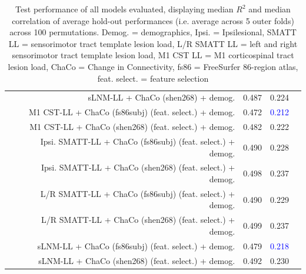 \documentclass[10pt]{article}
\newcommand{\colorProcessBlue}[1]{\textcolor{ProcessBlue}{#1}}
\newcommand{\colorNavyBlue}[1]{\textcolor{NavyBlue}{#1}}
\newcommand{\colorBlue}[1]{\textcolor{Blue}{#1}}
\begin{document}
\begin{table}[h]
\begin{tabular}{lrrrr}
 & sLNM-LL + ChaCo (shen268) + demog. & \colorNavyBlue{0.487} & \colorNavyBlue{0.224} \\
 & M1 CST-LL + ChaCo (fs86subj) (feat. select.) + demog. & \colorNavyBlue{0.472} & \colorBlue{0.212} \\
 & M1 CST-LL + ChaCo (shen268) (feat. select.) + demog. & \colorNavyBlue{0.482} & \colorNavyBlue{0.222} \\
 & Ipsi. SMATT-LL + ChaCo (fs86subj) (feat. select.) + demog. & \colorProcessBlue{0.490} & \colorNavyBlue{0.228} \\
 & Ipsi. SMATT-LL + ChaCo (shen268) (feat. select.) + demog. & \colorProcessBlue{0.498} & \colorProcessBlue{0.237} \\
 & L/R SMATT-LL + ChaCo (fs86subj) (feat. select.) + demog. & \colorProcessBlue{0.490} & \colorNavyBlue{0.229} \\
 & L/R SMATT-LL + ChaCo (shen268) (feat. select.) + demog. & \colorProcessBlue{0.499} & \colorProcessBlue{0.237} \\
 & sLNM-LL + ChaCo (fs86subj) (feat. select.) + demog. & \colorNavyBlue{0.479} & \colorBlue{0.218} \\
 & sLNM-LL + ChaCo (shen268) (feat. select.) + demog. & \colorProcessBlue{0.492} & \colorProcessBlue{0.230} \\
\bottomrule
\end{tabular}
\caption{Test performance of all models evaluated, displaying median $R^2$ and median correlation of average hold-out performances (i.e. average across 5 outer folds) across 100 permutations. Demog. = demographics, Ipsi. = Ipsilesional, SMATT LL = sensorimotor tract template lesion load, L/R SMATT LL = left and right sensorimotor tract template lesion load, M1 CST LL = M1 corticospinal tract lesion load, ChaCo = Change in Connectivity, fs86 = FreeSurfer 86-region atlas, feat. select. = feature selection}
\label{results_table_acutechronic}
\end{table}
\end{document}
